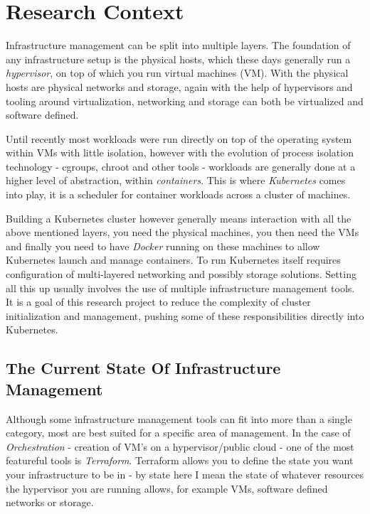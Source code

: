 \chapter{Research Context}
Infrastructure management can be split into multiple layers. The foundation of any infrastructure setup is the physical hosts, which these days generally run a \emph{hypervisor}, on top of which you run virtual machines (VM). With the physical hosts are physical networks and storage, again with the help of hypervisors and tooling around virtualization, networking and storage can both be virtualized and software defined. 

Until recently most workloads were run directly on top of the operating system within VMs with little isolation, however with the evolution of process isolation technology - cgroups, chroot and other tools - workloads are generally done at a higher level of abstraction, within \emph{containers}. This is where \emph{Kubernetes} \cite{44843} comes into play, it is a scheduler for container workloads across a cluster of machines.

Building a Kubernetes cluster however generally means interaction with all the above mentioned layers, you need the physical machines, you then need the VMs and finally you need to have \emph{Docker} running on these machines to allow Kubernetes launch and manage containers. To run Kubernetes itself requires configuration of multi-layered networking and possibly storage solutions. Setting all this up usually involves the use of multiple infrastructure management tools. It is a goal of this research project to reduce the complexity of cluster initialization and management, pushing some of these responsibilities directly into Kubernetes.

\section{The Current State Of Infrastructure Management}
Although some infrastructure management tools can fit into more than a single category, most are best suited for a specific area of management. In the case of \emph{Orchestration} - creation of VM's on a hypervisor/public cloud - one of the most featureful tools is \emph{Terraform}. Terraform allows you to define the state you want your infrastructure to be in - by state here I mean the state of whatever resources the hypervisor you are running allows, for example VMs, software defined networks or storage.


